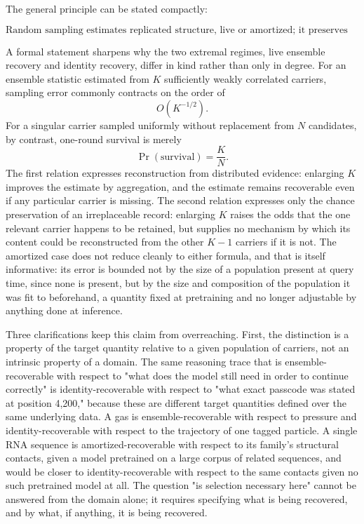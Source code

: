 \documentclass[11pt]{article}
\begin{document}
The general principle can be stated compactly:

\[
\boxed{\text{Random sampling estimates replicated structure, live or amortized; it preserves singular identity only by chance.}}
\]

A formal statement sharpens why the two extremal regimes, live ensemble recovery and identity recovery, differ in kind rather than only in degree. For an ensemble statistic estimated from $K$ sufficiently weakly correlated carriers, sampling error commonly contracts on the order of
\[
O\!\left(K^{-1/2}\right).
\]
For a singular carrier sampled uniformly without replacement from $N$ candidates, by contrast, one-round survival is merely
\[
\Pr(\text{survival}) = \frac{K}{N}.
\]
The first relation expresses reconstruction from distributed evidence: enlarging $K$ improves the estimate by aggregation, and the estimate remains recoverable even if any particular carrier is missing. The second relation expresses only the chance preservation of an irreplaceable record: enlarging $K$ raises the odds that the one relevant carrier happens to be retained, but supplies no mechanism by which its content could be reconstructed from the other $K-1$ carriers if it is not. The amortized case does not reduce cleanly to either formula, and that is itself informative: its error is bounded not by the size of a population present at query time, since none is present, but by the size and composition of the population it was fit to beforehand, a quantity fixed at pretraining and no longer adjustable by anything done at inference.

Three clarifications keep this claim from overreaching. First, the distinction is a property of the target quantity relative to a given population of carriers, not an intrinsic property of a domain. The same reasoning trace that is ensemble-recoverable with respect to "what does the model still need in order to continue correctly" is identity-recoverable with respect to "what exact passcode was stated at position 4,200," because these are different target quantities defined over the same underlying data. A gas is ensemble-recoverable with respect to pressure and identity-recoverable with respect to the trajectory of one tagged particle. A single RNA sequence is amortized-recoverable with respect to its family's structural contacts, given a model pretrained on a large corpus of related sequences, and would be closer to identity-recoverable with respect to the same contacts given no such pretrained model at all. The question "is selection necessary here" cannot be answered from the domain alone; it requires specifying what is being recovered, and by what, if anything, it is being recovered.
\end{document}
